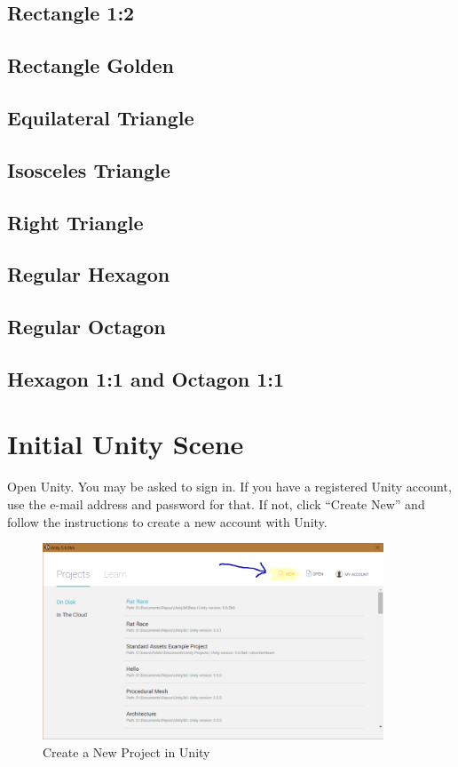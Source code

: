 \documentclass[12pt]{amsbook}
\theoremstyle{definition}
\theoremstyle{remark}
\numberwithin{figure}{chapter}
\numberwithin{table}{chapter}
\numberwithin{section}{chapter}
\numberwithin{equation}{section}
\begin{document}
\subsection{Rectangle 1:2}


\subsection{Rectangle Golden}

\subsection{Equilateral Triangle}

\subsection{Isosceles Triangle}

\subsection{Right Triangle}


\subsection{Regular Hexagon}


\subsection{Regular Octagon}

\subsection{Hexagon 1:1 and Octagon 1:1}

\section{Initial Unity Scene}\label{sec:unity}
Open Unity.  You may be asked to sign in.  If you have a registered Unity account, use the e-mail address and password for that.  If not, click ``Create New'' and follow the instructions to create a new account with Unity.

\begin{figure}[h]
  \includegraphics[width=4in]{NewButton.png}
  \caption{Create a New Project in Unity}
  \label{fig:new-button}
\end{figure}
\end{document}
